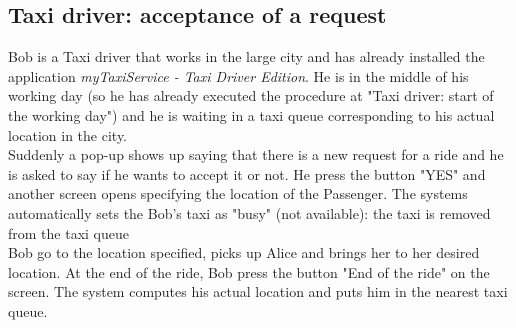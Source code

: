 \subsection{Taxi driver: acceptance of a request}
Bob is a Taxi driver that works in the large city and has already installed the application \textit{myTaxiService - Taxi Driver Edition}.
He is in the middle of his working day (so he has already executed the procedure at "Taxi driver: start of the working day") and he is waiting in a taxi queue corresponding to his actual location in the city.\\
Suddenly a pop-up shows up saying that there is a new request for a ride and he is asked to say if he wants to accept it or not.
He press the button "YES" and another screen opens specifying the location of the Passenger. The systems automatically sets the Bob's taxi as "busy" (not available): the taxi is removed from the taxi queue\\
Bob go to the location specified, picks up Alice and brings her to her desired location. At the end of the ride, Bob press the button "End of the ride" on the screen. The system computes his actual location and puts him in the nearest taxi queue.